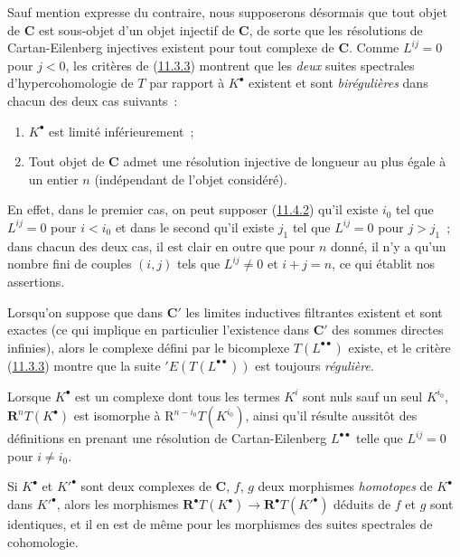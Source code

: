\begin{env}[11.4.4]
\label{0.11.4.4-fr}
Sauf mention expresse du contraire, nous supposerons désormais que tout objet
de $\boldsymbol{C}$ est sous-objet d'un objet injectif de $\boldsymbol{C}$, de sorte
que les résolutions de Cartan-Eilenberg injectives existent pour tout complexe
de $\boldsymbol{C}$. Comme $L^{ij}=0$ pour $j<0$, les critères de
(\hyperref[0.11.3.3-fr]{11.3.3}) montrent que les \emph{deux} suites
spectrales d'hypercohomologie de $T$ par rapport à $K^\bullet$ existent et
sont \emph{birégulières} dans chacun des deux cas suivants~:
\begin{enumerate}
  \item[$1^\circ$] $K^\bullet$ est limité inférieurement~;
  \item[$2^\circ$] Tout objet de $\boldsymbol{C}$ admet une résolution injective
    de longueur au plus égale à un entier $n$ (indépendant de l'objet
    considéré).
\end{enumerate}
En effet, dans le premier cas, on peut supposer
(\hyperref[0.11.4.2-fr]{11.4.2}) qu'il existe $i_0$ tel que $L^{ij}=0$ pour
$i<i_0$ et dans le second qu'il existe $j_1$ tel que $L^{ij}=0$ pour $j>j_1$~;
dans chacun des deux cas, il est clair en outre que pour $n$ donné, il n'y a
qu'un nombre fini de couples $(i,j)$ tels que $L^{ij}\neq0$ et $i+j=n$, ce
qui établit nos assertions.

Lorsqu'on suppose que dans $\boldsymbol{C}'$ les limites inductives filtrantes
existent et sont exactes (ce qui implique en particulier l'existence dans
$\boldsymbol{C}'$ des sommes directes infinies), alors le complexe défini par le
bicomplexe $T(L^{\bullet\bullet})$ existe, et le critère
(\hyperref[0.11.3.3-fr]{11.3.3}) montre que la suite
$'E(T(L^{\bullet\bullet}))$ est toujours \emph{régulière}.

Lorsque $K^\bullet$ est un complexe dont tous les termes $K^i$ sont nuls sauf
un seul $K^{i_0}$, $\mathbf R^nT(K^\bullet)$ est isomorphe à
$\mathrm R^{n-i_0}T(K^{i_0})$, ainsi qu'il résulte aussitôt des définitions en
prenant une résolution de Cartan-Eilenberg $L^{\bullet\bullet}$ telle que
$L^{ij}=0$ pour $i\neq i_0$.

Si $K^\bullet$ et $K'^\bullet$ sont deux complexes de $\boldsymbol{C}$, $f$, $g$
deux morphismes \emph{homotopes} de $K^\bullet$ dans $K'^\bullet$, alors les
morphismes $\mathbf R^\bullet T(K^\bullet)\to
\mathbf R^\bullet T(K'^\bullet)$ déduits de $f$ et $g$ sont identiques, et il
en est de même pour les morphismes des suites spectrales de cohomologie.
\end{env}

